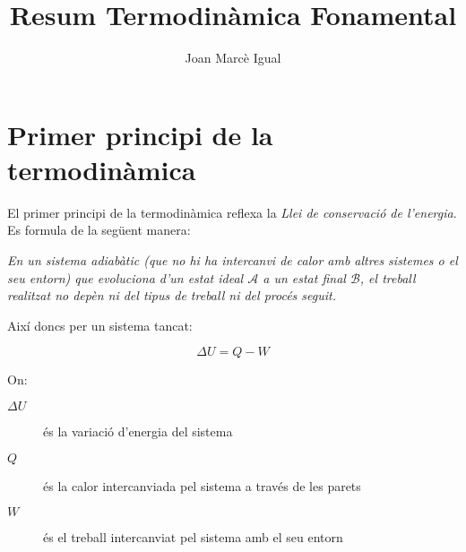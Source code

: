 \documentclass[a4paper]{article}
\title{Resum Termodinàmica Fonamental}
\author{Joan Marcè Igual}
\begin{document}
\maketitle

\section{Primer principi de la termodinàmica}

El primer principi de la termodinàmica reflexa la \emph{Llei de conservació de l'energia}. Es formula de la següent manera:

\begin{displayquote}
	\em
	En un sistema adiabàtic (que no hi ha intercanvi de calor amb altres sistemes o el seu entorn) que evoluciona d'un estat ideal $\mathcal{A}$ a un estat final $\mathcal{B}$, el treball realitzat no depèn ni del tipus de treball ni del procés seguit.
\end{displayquote}

Així doncs per un sistema tancat:

$$
\Delta U = Q - W
$$

On:
\begin{description}
	\item[\boldmath $\Delta U$] és la variació d'energia del sistema
	\item[\boldmath $Q$] és la calor intercanviada pel sistema a través de les parets
	\item[\boldmath $W$] és el treball intercanviat pel sistema amb el seu entorn
\end{description}
\end{document}
